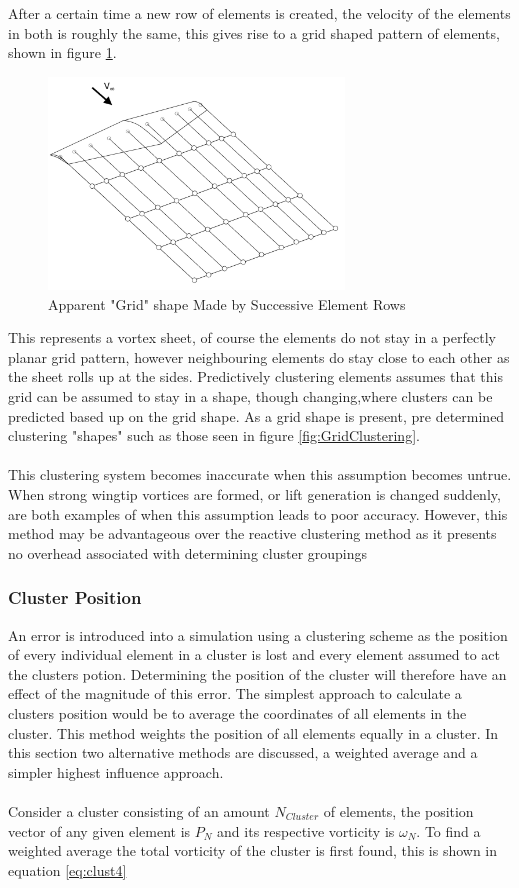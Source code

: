 After a certain time a new row of elements is created, the velocity of the elements in both is roughly the same, this gives rise to a grid shaped pattern of elements, shown in figure \ref{fig:WindGrid}. 

\begin{figure}[H]
\centering
\includegraphics[width=0.7\textwidth]{Figures/WingGrid.png}
\caption{\label{fig:WindGrid} Apparent "Grid" shape Made by Successive Element Rows}
\end{figure} 

This represents a vortex sheet, of course the elements do not stay in a perfectly planar grid pattern, however neighbouring elements do stay close to each other as the sheet rolls up at the sides. Predictively clustering elements assumes that this grid can be assumed to stay in a shape, though changing,where clusters can be predicted based up on the grid shape. As a grid shape is present, pre determined clustering "shapes" such as those seen in figure \ref{fig:GridClustering}.
\\\\
This clustering system becomes inaccurate when this assumption becomes untrue. When strong wingtip vortices are formed, or lift generation is changed suddenly, are both examples of when this assumption leads to poor accuracy. However, this method may be advantageous over the reactive clustering method as it presents no overhead associated with determining cluster groupings 

\subsubsection{Cluster Position}
An error is introduced into a simulation using a clustering scheme as the position of every individual element in a cluster is lost and every element assumed to act the clusters potion. Determining the position of the cluster will therefore have an effect of the magnitude of this error. The simplest approach to calculate a clusters position would be to average the coordinates of all elements in the cluster. This method weights the position of all elements equally in a cluster. In this section two alternative methods are discussed, a weighted average and a simpler highest influence approach.
\\\\
Consider a cluster consisting of an amount $N_{Cluster}$ of elements, the position vector of any given element is $P_{N}$ and its respective vorticity is $\omega_{N}$. To find a weighted average the total vorticity of the cluster is first found, this is shown in equation \ref{eq:clust4}

